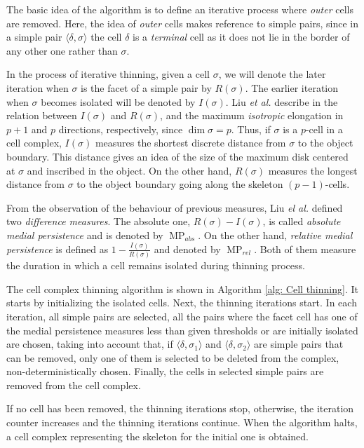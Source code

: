 \documentclass[journal]{IEEEtran}
\DeclareMathOperator{\MP}{MP}
\begin{document}
The basic idea of the algorithm is to define an iterative process where {\it
outer} cells are removed. Here, the idea of {\it outer} cells makes reference to
simple pairs, since in a simple pair $\langle \delta, \sigma \rangle$ the cell
$\delta$ is a {\it terminal} cell as it does not lie in the border of any other
one rather than $\sigma$.

In the process of iterative thinning, given a cell $\sigma$, we will denote the
later iteration when $\sigma$ is the facet of a simple pair by $R(\sigma)$. The
earlier iteration when $\sigma$ becomes isolated will be denoted by $I(\sigma)$.
Liu \emph{et al.} describe in \cite{DBLP:journals/cgf/LiuCLJ10} the relation
between $I(\sigma)$ and $R(\sigma)$, and the maximum \emph{isotropic} elongation
in $p+1$ and $p$ directions, respectively, since $\dim \sigma = p$. Thus, if
$\sigma$ is a $p$-cell in a cell complex, $I(\sigma)$ measures the shortest
discrete distance from $\sigma$ to the object boundary. This distance gives an
idea of the size of the maximum disk centered at $\sigma$ and inscribed in the
object. On the other hand, $R(\sigma)$ measures the longest distance from
$\sigma$ to the object boundary going along the skeleton $(p-1)$-cells.

From the observation of the behaviour of previous measures, Liu {\it el al.}
defined two \emph{difference measures}. The absolute one, $R(\sigma)-I(\sigma)$,
is called \emph{absolute medial persistence} and is denoted by $\MP_{abs}$. On
the other hand, \emph{relative medial persistence} is defined as
$1-\frac{I(\sigma)}{R(\sigma)}$ and denoted by $\MP_{rel}$. Both of them measure
the duration in which a cell remains isolated during thinning process.

The cell complex thinning algorithm is shown in Algorithm \ref{alg: Cell
thinning}. It starts by initializing the isolated cells. Next, the thinning
iterations start. In each iteration, all simple pairs are selected, all the
pairs where the facet cell has one of the medial persistence measures less than
given thresholds or are initially isolated are chosen, taking into account that, if 
$\langle \delta, \sigma_1\rangle$ and $\langle \delta, \sigma_2 \rangle$ are simple 
pairs that can be removed, only one of them is selected to be deleted from the complex, 
non-deterministically chosen. Finally, the cells in
selected simple pairs are removed from the cell complex.

If no cell has been removed, the thinning iterations stop,
otherwise, the iteration counter increases and the thinning
iterations continue. When the algorithm halts, a cell complex
representing the skeleton for the initial one is obtained.
\end{document}
